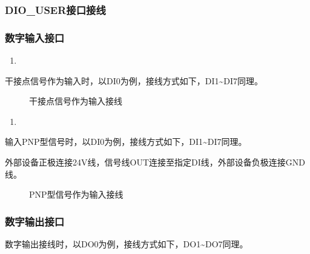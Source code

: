 \documentclass[a4paper,11pt,english,openany,oneside]{sphinxmanual}
\begin{document}
\subsubsection{DIO\_USER接口接线}
\label{\detokenize{08 _u5b89_u88c5_u4e0e_u8c03_u8bd5:id28}}\label{\detokenize{08 _u5b89_u88c5_u4e0e_u8c03_u8bd5:id29}}

\subsubsection{数字输入接口}
\label{\detokenize{08 _u5b89_u88c5_u4e0e_u8c03_u8bd5:id30}}\label{\detokenize{08 _u5b89_u88c5_u4e0e_u8c03_u8bd5:id31}}\begin{enumerate}
%
\item {} 
\sphinxAtStartPar
{}

\end{enumerate}

\sphinxAtStartPar
干接点信号作为输入时，以DI0为例，接线方式如下，DI1\textasciitilde{}DI7同理。

\begin{figure}[H]
\centering
\capstart

\noindent{}
\caption{干接点信号作为输入接线}\label{\detokenize{08 _u5b89_u88c5_u4e0e_u8c03_u8bd5:id59}}\end{figure}
\begin{enumerate}
%
\setcounter{enumi}{1}
\item {} 
\sphinxAtStartPar
{}

\end{enumerate}

\sphinxAtStartPar
输入PNP型信号时，以DI0为例，接线方式如下，DI1\textasciitilde{}DI7同理。

\sphinxAtStartPar
外部设备正极连接24V线，信号线OUT连接至指定DI线，外部设备负极连接GND线。

\begin{figure}[H]
\centering
\capstart

\noindent{}
\caption{PNP型信号作为输入接线}\label{\detokenize{08 _u5b89_u88c5_u4e0e_u8c03_u8bd5:id60}}\end{figure}


\subsubsection{数字输出接口}
\label{\detokenize{08 _u5b89_u88c5_u4e0e_u8c03_u8bd5:id32}}\label{\detokenize{08 _u5b89_u88c5_u4e0e_u8c03_u8bd5:id33}}
\sphinxAtStartPar
数字输出接线时，以DO0为例，接线方式如下，DO1\textasciitilde{}DO7同理。
\end{document}
